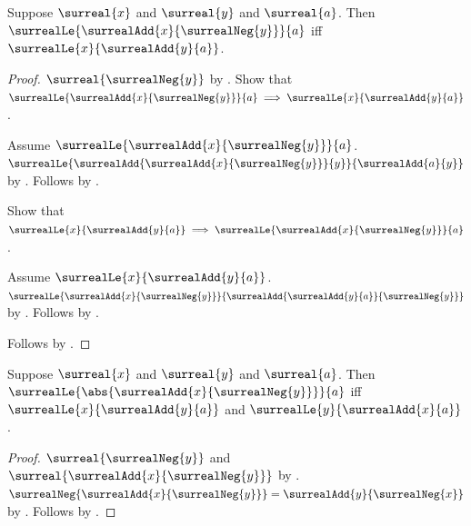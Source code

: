\begin{proposition}\label{surreal_difference_le_iff}
    Suppose $\surreal{x}$ and $\surreal{y}$ and $\surreal{a}$.
    Then
        $\surrealLe{\surrealAdd{x}{\surrealNeg{y}}}{a}$ iff
        $\surrealLe{x}{\surrealAdd{y}{a}}$.
\end{proposition}
\begin{proof}
    $\surreal{\surrealNeg{y}}$
        by .
    Show that
        $\surrealLe{\surrealAdd{x}{\surrealNeg{y}}}{a}
            \implies
         \surrealLe{x}{\surrealAdd{y}{a}}$.
    \begin{subproof}
        Assume
            $\surrealLe{\surrealAdd{x}{\surrealNeg{y}}}{a}$.
        $\surrealLe{
            \surrealAdd{\surrealAdd{x}{\surrealNeg{y}}}{y}}
            {\surrealAdd{a}{y}}$
            by .
        Follows by
            .
    \end{subproof}
    Show that
        $\surrealLe{x}{\surrealAdd{y}{a}}
            \implies
         \surrealLe{\surrealAdd{x}{\surrealNeg{y}}}{a}$.
    \begin{subproof}
        Assume $\surrealLe{x}{\surrealAdd{y}{a}}$.
        $\surrealLe{\surrealAdd{x}{\surrealNeg{y}}}
            {\surrealAdd{\surrealAdd{y}{a}}{\surrealNeg{y}}}$
            by .
        Follows by
            .
    \end{subproof}
    Follows by \auto.
\end{proof}

\begin{theorem}\label{surreal_abs_difference_le_iff}
    Suppose $\surreal{x}$ and $\surreal{y}$ and $\surreal{a}$.
    Then
        $\surrealLe{\abs{\surrealAdd{x}{\surrealNeg{y}}}}{a}$ iff
        $\surrealLe{x}{\surrealAdd{y}{a}}$ and
        $\surrealLe{y}{\surrealAdd{x}{a}}$.
\end{theorem}
\begin{proof}
    $\surreal{\surrealNeg{y}}$ and
        $\surreal{\surrealAdd{x}{\surrealNeg{y}}}$
        by
        .
    $\surrealNeg{\surrealAdd{x}{\surrealNeg{y}}}
        =\surrealAdd{y}{\surrealNeg{x}}$
        by .
    Follows by
        .
\end{proof}

